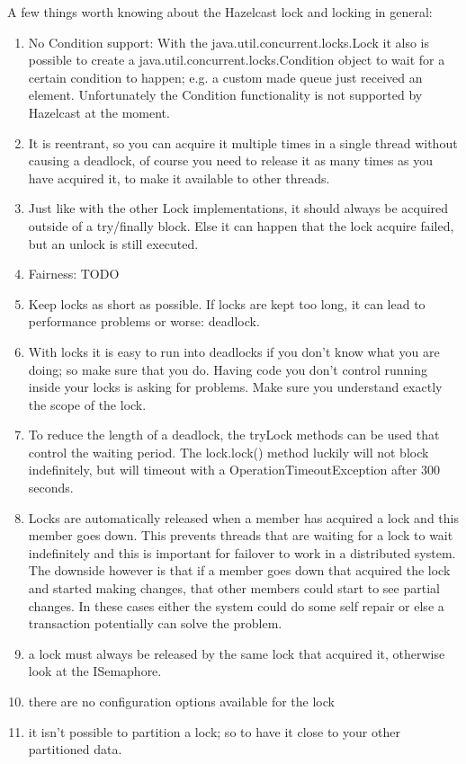 A few things worth knowing about the Hazelcast lock and locking in general:
\begin{enumerate}
\item No Condition support: With the java.util.concurrent.locks.Lock it also is possible to create a java.util.concurrent.locks.Condition object to wait for a certain condition to happen; e.g. a custom made queue just received an element. Unfortunately the Condition functionality is not supported by Hazelcast at the moment.
\item It is reentrant, so you can acquire it multiple times in a single thread without causing a deadlock, of course you need to release it as many times as you have acquired it, to make it available to other threads.
\item Just like with the other Lock implementations, it should always be acquired outside of a try/finally block. Else it can happen that the lock acquire failed, but an unlock is still executed. 
\item Fairness: TODO
\item Keep locks as short as possible. If locks are kept too long, it can lead to performance problems or worse: deadlock.
\item With locks it is easy to run into deadlocks if you don't know what you are doing; so make sure that you do. Having code you don't control running inside your locks is asking for problems. Make sure you understand exactly the scope of the lock. 
\item To reduce the length of a deadlock, the tryLock methods can be used that control the waiting period. The lock.lock() method luckily will not block indefinitely, but will timeout with a OperationTimeoutException after 300 seconds.  
\item Locks are automatically released when a member has acquired a lock and this member goes down. This prevents threads that are waiting for a lock to wait indefinitely and this is important for failover to work in a distributed system. The downside however is that if a member goes down that acquired the lock and started making changes, that other members could start to see partial changes. In these cases either the system could do some self repair or else a transaction potentially can solve the problem.
\item a lock must always be released by the same lock that acquired it, otherwise look at the ISemaphore.
\item there are no configuration options available for the lock
\item it isn't possible to partition a lock; so to have it close to your other partitioned data.
\end{enumerate}
